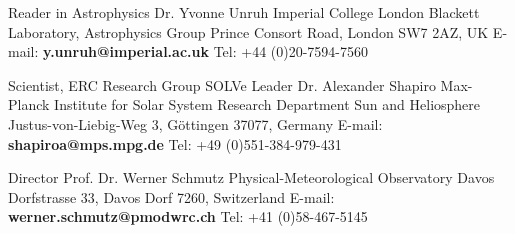 

\begin{cventries}

  \cventry
    {Reader in Astrophysics} %
    {Dr. Yvonne Unruh} %
    {} %
    {} %
    {Imperial College London\newline
     Blackett Laboratory, Astrophysics Group\newline
     Prince Consort Road, London SW7 2AZ, UK\newline
     E-mail: \textbf{y.unruh@imperial.ac.uk}\newline
     Tel: +44 (0)20-7594-7560} %

  \cventry
    {Scientist, ERC Research Group SOLVe Leader} %
    {Dr. Alexander Shapiro} %
    {} %
    {} %
    {Max-Planck Institute for Solar System Research\newline
     Department Sun and Heliosphere\newline
     Justus-von-Liebig-Weg 3, G{\"o}ttingen 37077, Germany\newline
     E-mail: \textbf{shapiroa@mps.mpg.de}\newline
     Tel: +49 (0)551-384-979-431} %

  \cventry
    {Director} %
    {Prof. Dr. Werner Schmutz} %
    {} %
    {} %
    {Physical-Meteorological Observatory Davos\newline
     Dorfstrasse 33, Davos Dorf 7260, Switzerland\newline
     E-mail: \textbf{werner.schmutz@pmodwrc.ch}\newline
     Tel: +41 (0)58-467-5145} %

\end{cventries}

